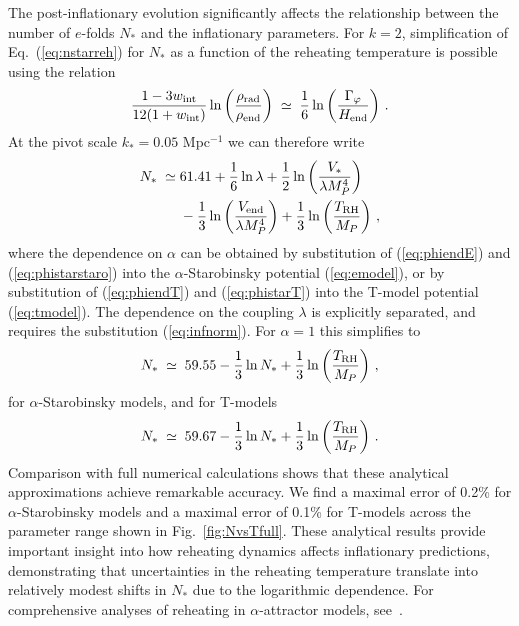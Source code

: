 \documentclass[aps,prev,twocolumn,preprintnumbers,floatfix,nofootinbib]{revtex4-1}
\newcommand{\beq}{\begin{equation}}
\newcommand{\eeq}{\end{equation}}
\begin{document}
The post-inflationary evolution significantly affects the relationship between the number of $e$-folds $N_*$ and the inflationary parameters. 
For $k=2$, simplification of Eq.~(\ref{eq:nstarreh}) for $N_*$ as a function of the reheating temperature is possible using the relation~\cite{Ellis:2021kad}
\beq
\frac{1-3w_{\mathrm{int}}}{12(1+w_{\mathrm{int}})}\ln\left(\frac{\rho_{\mathrm{rad}}}{\rho_{\mathrm{end}}}\right)\;\simeq\;\frac{1}{6}\ln\left(\frac{\Gamma_{\varphi}}{H_{\rm end}}\right)\,.
\eeq
At the pivot scale $k_* = 0.05$ Mpc$^{-1}$ we can therefore write
\begin{align} \notag
N_* \;\simeq\; &61.41 + \frac{1}{6}\ln\lambda + \frac{1}{2}\ln \left( \frac{V_*}{\lambda M_P^4}\right)  \\ \label{eq:Nstark2}
& - \frac{1}{3} \ln \left( \frac{V_{\rm end}}{\lambda M_P^4}\right) + \frac{1}{3}\ln\left(\frac{T_{\rm RH}}{M_P}\right) \,,
\end{align}
where the dependence on $\alpha$ can be obtained by substitution of (\ref{eq:phiendE}) and (\ref{eq:phistarstaro}) into the $\alpha$-Starobinsky potential (\ref{eq:emodel}), or by substitution of (\ref{eq:phiendT}) and (\ref{eq:phistarT}) into the T-model potential (\ref{eq:tmodel}). The dependence on the coupling $\lambda$ is explicitly separated, and requires the substitution (\ref{eq:infnorm}). For $\alpha=1$ this simplifies to
\beq
N_* \;\simeq\; 59.55 - \frac{1}{3}\ln N_* + \frac{1}{3}\ln\left(\frac{T_{\rm RH}}{M_P}\right) \,,
\eeq
for $\alpha$-Starobinsky models, and for T-models
\beq
N_* \;\simeq\; 59.67 - \frac{1}{3}\ln N_* + \frac{1}{3}\ln\left(\frac{T_{\rm RH}}{M_P}\right) \,.
\eeq
Comparison with full numerical calculations shows that these analytical approximations achieve remarkable accuracy. We find a maximal error of 0.2\% for $\alpha$-Starobinsky models and a maximal error of 0.1\% for T-models across the parameter range shown in Fig.~\ref{fig:NvsTfull}. These analytical results provide important insight into how reheating dynamics affects inflationary predictions, demonstrating that uncertainties in the reheating temperature translate into relatively modest shifts in $N_*$ due to the logarithmic dependence. For comprehensive analyses of reheating in $\alpha$-attractor models, see~\cite{Drewes:2017fmn,German}.
\end{document}

